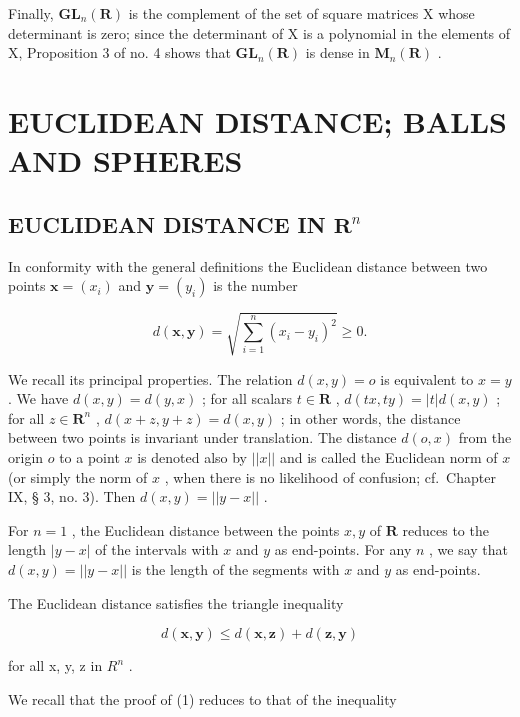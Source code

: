 Finally, \(\mathbf{GL}_{n}(\mathbf{R})\) is the complement of the set of square matrices X whose determinant is zero; since the determinant of X is a polynomial in the elements of X, Proposition 3 of no. 4 shows that \(\mathbf{GL}_{n}(\mathbf{R})\) is dense in \(\mathbf{M}_{n}(\mathbf{R})\) .

\section{EUCLIDEAN DISTANCE; BALLS AND SPHERES}

\subsection{\texorpdfstring{EUCLIDEAN DISTANCE IN \(\mathbf{R}^n\)}{EUCLIDEAN DISTANCE IN R TO THE N}}

In conformity with the general definitions the Euclidean distance between two points \(\boldsymbol{x} = (x_{i})\) and \(\boldsymbol{y} = (y_{i})\) is the number

\[
d (\boldsymbol {x}, \boldsymbol {y}) = \sqrt {\sum_ {i = 1} ^ {n} (x _ {i} - y _ {i}) ^ {2}} \geqslant 0.
\]

We recall its principal properties. The relation \(d(x, y) = o\) is equivalent to \(x = y\) . We have \(d(x, y) = d(y, x)\) ; for all scalars \(t \in \mathbf{R}\) , \(d(tx, ty) = |t|d(x, y)\) ; for all \(z \in \mathbf{R}^n\) , \(d(x + z, y + z) = d(x, y)\) ; in other words, the distance between two points is invariant under translation. The distance \(d(o, x)\) from the origin \(o\) to a point \(x\) is denoted also by \(||x||\) and is called the Euclidean norm of \(x\) (or simply the norm of \(x\) , when there is no likelihood of confusion; cf.~Chapter IX, § 3, no. 3). Then \(d(x, y) = ||y - x||\) .

For \(n = 1\) , the Euclidean distance between the points \(x, y\) of \(\mathbf{R}\) reduces to the length \(|y - x|\) of the intervals with \(x\) and \(y\) as end-points. For any \(n\) , we say that \(d(x, y) = ||y - x||\) is the length of the segments with \(x\) and \(y\) as end-points.

The Euclidean distance satisfies the triangle inequality

\[
d (\boldsymbol {x}, \boldsymbol {y}) \leqslant d (\boldsymbol {x}, \boldsymbol {z}) + d (\boldsymbol {z}, \boldsymbol {y})\tag{1}
\]

for all x, y, z in \(R^{n}\) .

We recall that the proof of (1) reduces to that of the inequality

